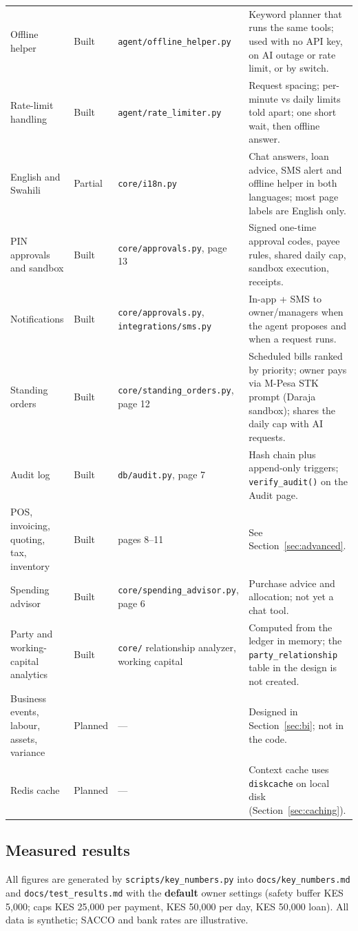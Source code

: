 \documentclass[10pt,a4paper]{article}
\newcommand{\code}[1]{\texttt{\small #1}}
\begin{document}
\begin{longtable}{@{}p{3.6cm}p{1.3cm}p{4.0cm}p{6.0cm}@{}}
Offline helper & Built & \code{agent/offline\_helper.py} & Keyword planner that runs the same tools; used with no API key, on AI outage or rate limit, or by switch.\\
Rate-limit handling & Built & \code{agent/rate\_limiter.py} & Request spacing; per-minute vs daily limits told apart; one short wait, then offline answer.\\
English and Swahili & Partial & \code{core/i18n.py} & Chat answers, loan advice, SMS alert and offline helper in both languages; most page labels are English only.\\
PIN approvals and sandbox & Built & \code{core/approvals.py}, page 13 & Signed one-time approval codes, payee rules, shared daily cap, sandbox execution, receipts.\\
Notifications & Built & \code{core/approvals.py}, \code{integrations/sms.py} & In-app + SMS to owner/managers when the agent proposes and when a request runs.\\
Standing orders & Built & \code{core/standing\_orders.py}, page 12 & Scheduled bills ranked by priority; owner pays via M-Pesa STK prompt (Daraja sandbox); shares the daily cap with AI requests.\\
Audit log & Built & \code{db/audit.py}, page 7 & Hash chain plus append-only triggers; \code{verify\_audit()} on the Audit page.\\
POS, invoicing, quoting, tax, inventory & Built & pages 8--11 & See Section~\ref{sec:advanced}.\\
Spending advisor & Built & \code{core/spending\_advisor.py}, page 6 & Purchase advice and allocation; not yet a chat tool.\\
Party and working-capital analytics & Built & \code{core/} relationship analyzer, working capital & Computed from the ledger in memory; the \code{party\_relationship} table in the design is not created.\\
Business events, labour, assets, variance & Planned & --- & Designed in Section~\ref{sec:bi}; not in the code.\\
Redis cache & Planned & --- & Context cache uses \code{diskcache} on local disk (Section~\ref{sec:caching}).\\
\bottomrule
\end{longtable}
\endgroup

\subsection{Measured results}
\label{sec:measured}
All figures are generated by \code{scripts/key\_numbers.py} into \code{docs/key\_numbers.md} and \code{docs/test\_results.md} with the \textbf{default} owner settings (safety buffer KES 5{,}000; caps KES 25{,}000 per payment, KES 50{,}000 per day, KES 50{,}000 loan). All data is synthetic; SACCO and bank rates are illustrative.
\end{document}
